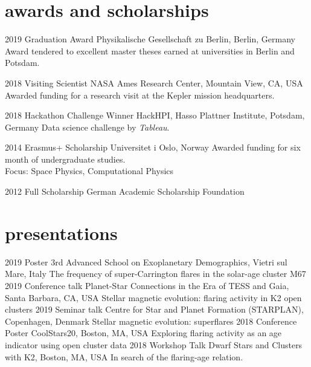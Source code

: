 \documentclass[]{k-cv} %
\begin{document}

\section{awards and scholarships}

\begin{entrylist}
\entry
{2019}
{Graduation Award}
{Physikalische Gesellschaft zu Berlin, Berlin, Germany}
{Award tendered to excellent master theses earned at universities in Berlin and Potsdam.}


\entry
{2018}
{Visiting Scientist}
{NASA Ames Research Center, Mountain View, CA, USA}
{Awarded funding for a research visit at the Kepler mission headquarters.}

\entry
{2018}
{Hackathon Challenge Winner}
{HackHPI, Hasso Plattner Institute, Potsdam, Germany}
{Data science challenge by \emph{Tableau}.}

\entry
{2014}
{Erasmus+ Scholarship}
{Universitet i Oslo, Norway}
{Awarded funding for six month of undergraduate studies.\\
Focus: Space Physics, Computational Physics}

\entry
{2012 }
{Full Scholarship}
{German Academic Scholarship Foundation}


\end{entrylist}

\clearpage



\section{presentations}

\begin{entrylist}
\entry
{2019}
{Poster}
{3rd Advanced School on Exoplanetary Demographics, Vietri sul Mare, Italy}
{The frequency of super-Carrington flares in the solar-age cluster M67}
\entry
{2019}
{Conference talk}
{Planet-Star Connections in the Era of TESS and Gaia, Santa Barbara, CA, USA}
{Stellar magnetic evolution: flaring activity in K2 open clusters}
\entry
{2019}
{Seminar talk}
{Centre for Star and Planet Formation (STARPLAN), Copenhagen, Denmark}
{Stellar magnetic evolution: superflares}
\entry
{2018}
{Conference Poster}
{CoolStars20, Boston, MA, USA}
{Exploring flaring activity as an age indicator using open cluster data}
\entry
{2018}
{Workshop Talk}
{Dwarf Stars and Clusters with K2, Boston, MA, USA}
{In search of the flaring-age relation.}
\end{entrylist}
\end{document}
